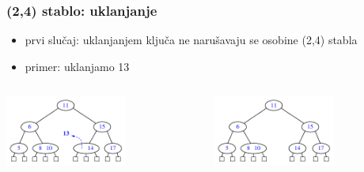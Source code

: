 \documentclass[compress,aspectratio=169]{beamer}
\begin{document}
\begin{frame}[fragile]
  \frametitle{(2,4) stablo: uklanjanje}
  \begin{itemize}
    \item prvi slučaj: uklanjanjem ključa ne narušavaju se osobine (2,4) stabla
    \item primer: uklanjamo 13
  \end{itemize}
  \begin{columns}
    \begin{column}[c]{6cm}
      \begin{center}
        \includegraphics[width=4cm]{asp-11-pic34a.pdf}
      \end{center}
    \end{column}
    \begin{column}[c]{6cm}
      \begin{center}
        \includegraphics[width=4cm]{asp-11-pic34b.pdf}
      \end{center}
    \end{column}
  \end{columns}
\end{frame}
\end{document}
